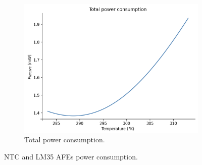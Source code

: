 \documentclass[12pt]{article}
\begin{document}
\begin{figure}[h]
\begin{subfigure}{0.45\textwidth}
            \includegraphics*[scale = 0.35]{images/PowerTotal.png}
            \caption{Total power consumption.}
        \end{subfigure}
        \caption{NTC and LM35 AFEs power consumption.}
        \label{powerteo}
    \end{figure}

    
\end{document}
